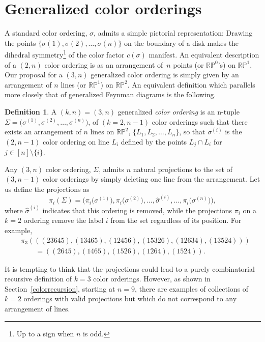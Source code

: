 \documentclass[pdftex]{sigma}
\theoremstyle{definition}
\newtheorem{defn}[thm]{Definition}
\def \be {\begin{equation}}
\def \ee {\end{equation}}
\def \be {\begin{equation}}
\numberwithin{equation}{section}
\begin{document}
\section{Generalized color orderings}\label{sectionordering}

A standard color ordering, $\sigma$, admits a simple pictorial representation: Drawing the points $\{ \sigma(1),\sigma(2), \dots ,\sigma(n) \}$ on the boundary of a disk makes the dihedral symmetry\footnote{Up to a sign when $n$ is odd.} of the color factor $c(\sigma )$ manifest. An equivalent description of a $(2,n)$ color ordering is as an arrangement of~$n$ points \big(or $\mathbb{RP}^0$'s\big) on $\mathbb{RP}^1$.
Our proposal for a $(3,n)$ generalized color ordering is simply given by an arrangement of $n$ lines \big(or $\mathbb{RP}^1$\big) on $\mathbb{RP}^2$. An equivalent definition which parallels more closely that of generalized Feynman diagrams is the following.

\begin{defn}\label{GCO}
A $(k,n)\!=\!(3,n)$ generalized {\it color ordering} is an n-tuple $\Sigma \!=\! \big( \sigma^{(1)},\sigma^{(2)}, \dots ,\sigma^{(n)}\! \big)$, of $(k=2,n-1)$ color orderings such that there exists an arrangement of $n$ lines on $\mathbb{RP}^2$, $\{ L_1,L_2,\dots ,L_n \}$, so that $\sigma^{(i)}$ is the $(2,n-1)$ color ordering on line $L_i$ defined by the points $L_j\cap L_i$ for $j\in [n]\setminus \{i\}$.
\end{defn}

Any $(3,n)$ color ordering, $\Sigma$, admits $n$ natural projections to the set of $(3,n-1)$ color orderings by simply deleting one line from the arrangement. Let us define the projections as
\be
\label{colorprojection}
\pi_i(\Sigma ) = \big( \pi_i\big(\sigma^{(1)}\big),\pi_i\big(\sigma^{(2)}\big), \dots ,\hat\sigma^{(i)},\dots ,\pi_i\big(\sigma^{(n)}\big) \big),
\ee
where $\hat\sigma^{(i)}$ indicates that this ordering is removed, while the projections $\pi_i$ on a $k=2$ ordering remove the label $i$ from the set regardless of its position. For example,
\begin{align*}
 & \pi_3(((23645),(13465),(12456),(15326),(12634),(13524))) \\ & \qquad = ((2645),(1465),(1526),(1264),(1524)).
\end{align*}

It is tempting to think that the projections could lead to a purely combinatorial recursive definition of $k=3$ color orderings. However, as shown in Section~\ref{colorrecursion}, starting at $n=9$, there are examples of collections of $k=2$ orderings with valid projections but which do not correspond to any arrangement of lines.
\end{document}
